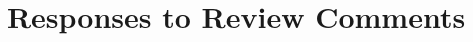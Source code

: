 \documentclass[twocolumn]{myreviewresponse}
\title{Responses to Review Comments}
\date{}
\begin{document}
\maketitle

\begin{comment*}
\end{comment*}

\begin{response}
\end{response}

\newreviewer%

\begin{comment}[W1]\label{R1W1}
\end{comment}

\begin{response}
\end{response}

\balance%
\end{document}
